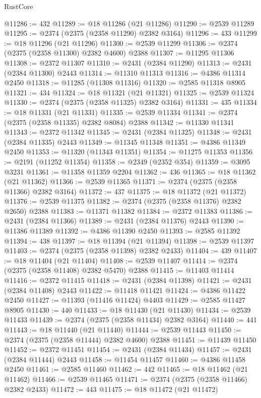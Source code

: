 \begin{lexlean}{RustCore}
\begin{coremodule}
@11286 := 432
@11289 := @18 @11286 (@21 @11286)
@11290 := @2539 @11289
@11295 := @2374 (@2375 (@2358 @11290) @2382 @3164)
@11296 := 433
@11299 := @18 @11296 (@21 @11296)
@11300 := @2539 @11299
@11306 := @2374 (@2375 (@2358 @11300) @2382 @4600) @2388
@11307 := @11295 @11306
@11308 := @2372 @11307
@11310 := @2431 (@2384 @11290)
@11313 := @2431 (@2384 @11300) @2443
@11314 := @11310 @11313
@11316 := @4386 @11314 @2450
@11318 := @11285 (@11308 @11316)
@11320 := @2585 @11318 @8905
@11321 := 434
@11324 := @18 @11321 (@21 @11321)
@11325 := @2539 @11324
@11330 := @2374 (@2375 (@2358 @11325) @2382 @3164)
@11331 := 435
@11334 := @18 @11331 (@21 @11331)
@11335 := @2539 @11334
@11341 := @2374 (@2375 (@2358 @11335) @2382 @8084) @2388
@11342 := @11330 @11341
@11343 := @2372 @11342
@11345 := @2431 (@2384 @11325)
@11348 := @2431 (@2384 @11335) @2443
@11349 := @11345 @11348
@11351 := @4386 @11349 @2450
@11353 := @11320 (@11343 @11351)
@11354 := @11275 @11353
@11356 := @2191 (@11252 @11354)
@11358 := @2349 (@2352 @354)
@11359 := @3095 @3231
@11361 := @11358 @11359 @2204
@11362 := 436
@11365 := @18 @11362 (@21 @11362)
@11366 := @2539 @11365
@11371 := @2374 (@2375 (@2358 @11366) @2382 @3164)
@11372 := 437
@11375 := @18 @11372 (@21 @11372)
@11376 := @2539 @11375
@11382 := @2374 (@2375 (@2358 @11376) @2382 @2650) @2388
@11383 := @11371 @11382
@11384 := @2372 @11383
@11386 := @2431 (@2384 @11366)
@11389 := @2431 (@2384 @11376) @2443
@11390 := @11386 @11389
@11392 := @4386 @11390 @2450
@11393 := @2585 @11392
@11394 := 438
@11397 := @18 @11394 (@21 @11394)
@11398 := @2539 @11397
@11403 := @2374 (@2375 (@2358 @11398) @2382 @2433)
@11404 := 439
@11407 := @18 @11404 (@21 @11404)
@11408 := @2539 @11407
@11414 := @2374 (@2375 (@2358 @11408) @2382 @5470) @2388
@11415 := @11403 @11414
@11416 := @2372 @11415
@11418 := @2431 (@2384 @11398)
@11421 := @2431 (@2384 @11408) @2443
@11422 := @11418 @11421
@11424 := @4386 @11422 @2450
@11427 := @11393 (@11416 @11424) @4403
@11429 := @2585 @11427 @8905
@11430 := 440
@11433 := @18 @11430 (@21 @11430)
@11434 := @2539 @11433
@11439 := @2374 (@2375 (@2358 @11434) @2382 @3164)
@11440 := 441
@11443 := @18 @11440 (@21 @11440)
@11444 := @2539 @11443
@11450 := @2374 (@2375 (@2358 @11444) @2382 @4600) @2388
@11451 := @11439 @11450
@11452 := @2372 @11451
@11454 := @2431 (@2384 @11434)
@11457 := @2431 (@2384 @11444) @2443
@11458 := @11454 @11457
@11460 := @4386 @11458 @2450
@11461 := @2585 @11460
@11462 := 442
@11465 := @18 @11462 (@21 @11462)
@11466 := @2539 @11465
@11471 := @2374 (@2375 (@2358 @11466) @2382 @2433)
@11472 := 443
@11475 := @18 @11472 (@21 @11472)

\end{coremodule}
\end{lexlean}
